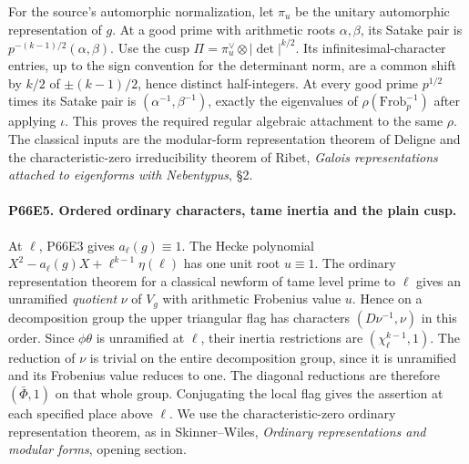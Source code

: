 For the source's automorphic normalization, let $\pi_u$ be the
unitary automorphic representation of $g$. At a good prime with
arithmetic roots $\alpha,\beta$, its Satake pair is
$p^{-(k-1)/2}(\alpha,\beta)$. Use the cusp
$\Pi=\pi_u^\vee\otimes|\det|^{k/2}$. Its infinitesimal-character
entries, up to the sign convention for the determinant norm, are a
common shift by $k/2$ of $\pm(k-1)/2$, hence distinct half-integers.
At every good prime $p^{1/2}$ times its Satake pair is
$(\alpha^{-1},\beta^{-1})$, exactly the eigenvalues of
$\rho(\mathrm{Frob}_p^{-1})$ after applying $\iota$.
This proves the required regular algebraic attachment to the same
$\rho$. The classical inputs are the modular-form representation
theorem of Deligne and the characteristic-zero irreducibility
theorem of Ribet, \emph{Galois representations attached to eigenforms
with Nebentypus}, \S2.

\paragraph{P66E5. Ordered ordinary characters, tame inertia and the plain cusp.}
At $\ell$, P66E3 gives $a_\ell(g)\equiv1$. The Hecke polynomial
$X^2-a_\ell(g)X+\ell^{k-1}\eta(\ell)$ has one unit root
$u\equiv1$. The ordinary representation theorem for a classical
newform of tame level prime to $\ell$ gives an unramified
\emph{quotient} $\nu$ of $V_g$ with arithmetic Frobenius value $u$.
Hence on a decomposition group the upper triangular flag has
characters $(D\nu^{-1},\nu)$ in this order. Since $\phi\theta$
is unramified at $\ell$, their inertia restrictions are
$(\chi_\ell^{k-1},1)$. The reduction of $\nu$ is trivial on the
entire decomposition group, since it is unramified and its
Frobenius value reduces to one. The diagonal reductions are
therefore $(\bar\Phi,1)$ on that whole group. Conjugating the
local flag gives the assertion at each specified place above $\ell$.
We use the characteristic-zero ordinary representation theorem,
as in Skinner--Wiles, \emph{Ordinary representations and modular
forms}, opening section.

